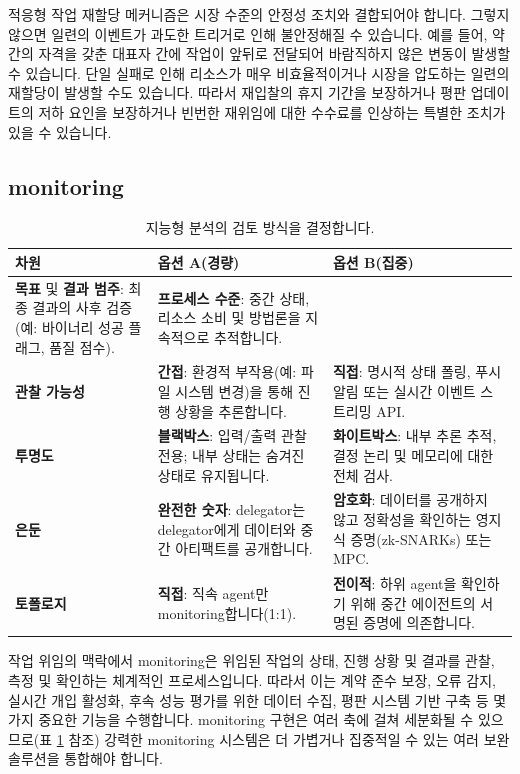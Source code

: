 \documentclass[11pt, a4paper, twocolumn, copyright, goog]{google}
\begin{document}
적응형 작업 재할당 메커니즘은 시장 수준의 안정성 조치와 결합되어야 합니다. 그렇지 않으면 일련의 이벤트가 과도한 트리거로 인해 불안정해질 수 있습니다. 예를 들어, 약간의 자격을 갖춘 대표자 간에 작업이 앞뒤로 전달되어 바람직하지 않은 변동이 발생할 수 있습니다. 단일 실패로 인해 리소스가 매우 비효율적이거나 시장을 압도하는 일련의 재할당이 발생할 수도 있습니다. 따라서 재입찰의 휴지 기간을 보장하거나 평판 업데이트의 저하 요인을 보장하거나 빈번한 재위임에 대한 수수료를 인상하는 특별한 조치가 있을 수 있습니다.

\subsection{monitoring}
\label{sec:monitor}

\begin{table}[t]
\caption{지능형 분석의 검토 방식을 결정합니다.}
\label{tab:monitoring_taxonomy}
\centering
\begin{tabular}{@{}lp{6.5cm}p{6.5cm}@{}}
\toprule
\textbf{차원} & \textbf{옵션 A(경량)} & \textbf{옵션 B(집중)} \\ \midrule
\textbf{목표} 및 \textbf{결과 범주}: 최종 결과의 사후 검증(예: 바이너리 성공 플래그, 품질 점수). & \textbf{프로세스 수준}: 중간 상태, 리소스 소비 및 방법론을 지속적으로 추적합니다. \\ \midrule
\textbf{관찰 가능성} & \textbf{간접}: 환경적 부작용(예: 파일 시스템 변경)을 통해 진행 상황을 추론합니다. & \textbf{직접}: 명시적 상태 폴링, 푸시 알림 또는 실시간 이벤트 스트리밍 API. \\ \midrule
\textbf{투명도} & \textbf{블랙박스}: 입력/출력 관찰 전용; 내부 상태는 숨겨진 상태로 유지됩니다. & \textbf{화이트박스}: 내부 추론 추적, 결정 논리 및 메모리에 대한 전체 검사. \\ \midrule
\textbf{은둔} & \textbf{완전한 숫자}: delegator는 delegator에게 데이터와 중간 아티팩트를 공개합니다. & \textbf{암호화}: 데이터를 공개하지 않고 정확성을 확인하는 영지식 증명(zk-SNARKs) 또는 MPC. \\ \midrule
\textbf{토폴로지} & \textbf{직접}: 직속 agent만 monitoring합니다(1:1). & \textbf{전이적}: 하위 agent을 확인하기 위해 중간 에이전트의 서명된 증명에 의존합니다. \\ \bottomrule
\end{tabular}
\end{table}

작업 위임의 맥락에서 monitoring은 위임된 작업의 상태, 진행 상황 및 결과를 관찰, 측정 및 확인하는 체계적인 프로세스입니다. 따라서 이는 계약 준수 보장, 오류 감지, 실시간 개입 활성화, 후속 성능 평가를 위한 데이터 수집, 평판 시스템 기반 구축 등 몇 가지 중요한 기능을 수행합니다. monitoring 구현은 여러 축에 걸쳐 세분화될 수 있으므로(표 \ref{tab:monitoring_taxonomy} 참조) 강력한 monitoring 시스템은 더 가볍거나 집중적일 수 있는 여러 보완 솔루션을 통합해야 합니다.
\end{document}
